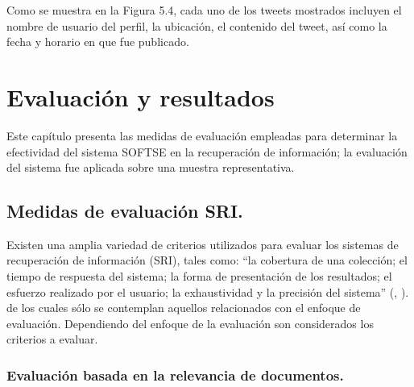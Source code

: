 Como se muestra en la Figura 5.4, cada uno de los tweets mostrados incluyen el nombre de usuario del perfil, la ubicación, el contenido del tweet, así como la fecha y horario en que fue publicado.
%
%

\chapter{Evaluación y resultados}
\label{chap:resul}

Este capítulo presenta las medidas de evaluación empleadas para determinar la efectividad del sistema SOFTSE en la recuperación de información; la evaluación del sistema fue aplicada sobre una muestra representativa.  


\section{Medidas de evaluación SRI.}
\label{sec:sec06}

Existen una amplia variedad de criterios utilizados para evaluar los sistemas de recuperación de información (SRI), tales como: “la cobertura de una colección; el tiempo de respuesta del sistema; la forma de presentación de los resultados; el esfuerzo realizado por el usuario; la exhaustividad y la precisión del sistema” (\citeauthor{RIJ}, \citeyear{RIJ}). de los cuales sólo se contemplan aquellos relacionados con el enfoque de evaluación.
Dependiendo del enfoque de la evaluación son considerados los criterios a evaluar.






\subsection{Evaluación basada en la relevancia de documentos.}
\label{subsec:subsec06}

